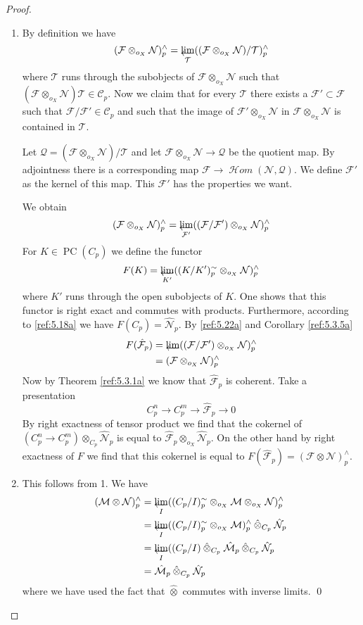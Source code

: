 \documentclass{amsproc}
\def\Cscr{{\mathcal C}}
\def\Fscr{{\mathcal F}}
\def\Hscr{{\mathcal H}}
\def\Mscr{{\mathcal M}}
\def\Nscr{{\mathcal N}}
\def\Qscr{{\mathcal Q}}
\def\Tscr{{\mathcal T}}
\def\HHom{\operatorname {\Hscr \mathit{om}}}
\def\ctimes{\mathbin{\hat{\otimes}}}
\def\HHom{\operatorname {\Hscr \mathit{om}}}
\def\r{\rightarrow}
\let\invlim\projlim
\DeclareMathOperator{\PC}{PC}
\theoremstyle{definition}
\theoremstyle{remark}
\def\invlim{\mathop{\vtop{\baselineskip -100pt\lineskip -1pt\lineskiplimit 0pt
\setbox0\hbox{\upshape lim}\copy0\hbox to \wd0{\leftarrowfill}}}\limits}
\numberwithin{equation}{section}
\numberwithin{table}{section}
\numberwithin{figure}{section}
\begin{document}
\begin{proof}
\begin{enumerate}
\item
By definition we have
\[
(\Fscr\otimes_{o_X} \Nscr)^\wedge_{p}=\invlim_\Tscr(
(\Fscr\otimes_{o_X} \Nscr) /\Tscr)^\wedge_p
\]
where $\Tscr$ runs through the subobjects of $\Fscr\otimes_{o_X} \Nscr$ such
that $(\Fscr\otimes_{o_X}\Nscr)\Tscr\in \Cscr_p$. Now we claim that for
every $\Tscr$ there exists a $\Fscr'\subset \Fscr$ such that
$\Fscr/\Fscr'\in\Cscr_p$ and such that the image
of $\Fscr'\otimes_{o_X} \Nscr$ in $\Fscr\otimes_{o_X} \Nscr$ is contained in
$\Tscr$.

Let $\Qscr=(\Fscr\otimes_{o_X} \Nscr) /\Tscr$ and let
$\Fscr\otimes_{o_X}\Nscr\r \Qscr$ be the quotient map. By adjointness
there is a corresponding map $ \Fscr\r \HHom(\Nscr,\Qscr)$. We define
$\Fscr'$ as the kernel of this map.  This $\Fscr'$ has the properties
we want.

We obtain
\begin{equation}
\label{ref:5.22a}
(\Fscr\otimes_{o_X} \Nscr)^\wedge_{p}=\invlim_{\Fscr'}
((\Fscr/\Fscr')\otimes_{o_X} \Nscr)^\wedge_p
\end{equation}
For $K\in \PC(C_p)$ we define the functor 
\[
F(K)=\invlim_{K'} ((K/K')^\sim_p \otimes_{o_X} \Nscr)^\wedge_p
\]
where $K'$ runs through the open subobjects of $K$. One shows  that
this functor is right exact and commutes with products. Furthermore,
according to \eqref{ref:5.18a} we
have $F(C_p)=\hat{\Nscr}_p$. By 
 \eqref{ref:5.22a} and Corollary \ref{ref:5.3.5a}
\begin{align*}
F(\hat{\Fscr}_p)&=\invlim ((\Fscr/\Fscr')\otimes_{o_X} \Nscr)^\wedge_p\\
&=(\Fscr\otimes_{o_X}\Nscr)^\wedge_p
\end{align*}
Now by Theorem \ref{ref:5.3.1a} we know that $\hat{\Fscr}_p$ is coherent. Take a
presentation
\[
C^n_p\r C_p^m\r \hat{\Fscr}_p\r 0
\]
By right exactness of tensor product we find that the cokernel of
$(C^n_p\r C_p^m)\otimes_{C_p} \hat{\Nscr}_p$ is equal to
$\hat{\Fscr}_p\otimes_{o_X} \hat{\Nscr}_p$. On the other hand by right
exactness of $F$ we find that this cokernel is equal to
$F(\hat{\Fscr}_p)=(\Fscr\otimes\Nscr)^\wedge_p$.
\item
This follows from 1. We have
\begin{align*}
(\Mscr\otimes\Nscr)^\wedge_p&=\invlim_I ((C_p/I)^\sim_p\otimes_{o_X}
\Mscr\otimes_{o_X}\Nscr)^\wedge_p\\
&=\invlim_I ((C_p/I)_p^\sim\otimes_{o_X} \Mscr)^\wedge_p\ctimes_{C_p} \hat{\Nscr}_p\\
&=\invlim_I ((C_p/I)\ctimes_{C_p} \hat{\Mscr}_p\ctimes_{C_p} \hat{\Nscr}_p\\
&= \hat{\Mscr}_p\ctimes_{C_p} \hat{\Nscr}_p
\end{align*}
where we have used the fact that $\ctimes$ commutes with inverse limits.
\qed\end{enumerate}
\def\qed{}
\end{proof}
\end{document}
